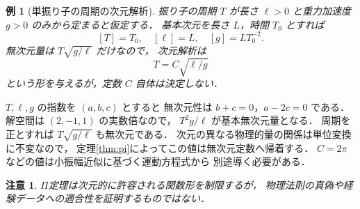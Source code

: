 \documentclass[a5paper,10pt,onecolumn]{jsarticle}
\makeatletter
\theoremstyle{mathnotetheorem}
\newtheorem{example}[theorem]{例}
\newtheorem{remark}[theorem]{注意}
\renewcommand{\proofname}{証明}
\renewenvironment{proof}[1][\proofname]{%
  \par\pushQED{\qed}\normalfont\topsep4\p@\@plus2\p@\relax
  \trivlist\item[\hskip\labelsep\bfseries #1]\ignorespaces
}{\popQED\endtrivlist\@endpefalse}
\makeatother
\begin{document}
\begin{example}[単振り子の周期の次元解析]
振り子の周期 $T$ が長さ $\ell>0$ と重力加速度
$g>0$ のみから定まると仮定する．
基本次元を長さ $L$，時間 $T_0$ とすれば
\[
 [T]=T_0,\quad [\ell]=L,\quad [g]=LT_0^{-2}.
\]
無次元量は $T\sqrt{g/\ell}$ だけなので，
次元解析は
\[
 T=C\sqrt{\ell/g}
\]
という形を与えるが，定数 $C$ 自体は決定しない．
\end{example}
\begin{proof}
$T,\ell,g$ の指数を $(a,b,c)$ とすると
無次元性は $b+c=0$，$a-2c=0$ である．
解空間は $(2,-1,1)$ の実数倍なので，
$T^2g/\ell$ が基本無次元量となる．
周期を正とすれば
$T\sqrt{g/\ell}$ も無次元である．
次元の異なる物理的量の関係は単位変換に不変なので，
定理\ref{thm:pi}によってこの値は無次元定数へ帰着する．
$C=2\pi$ などの値は小振幅近似に基づく運動方程式から
別途導く必要がある．
\end{proof}
\begin{remark}
$\Pi$定理は次元的に許容される関数形を制限するが，
物理法則の真偽や経験データへの適合性を証明するものではない．
\end{remark}
\end{document}
